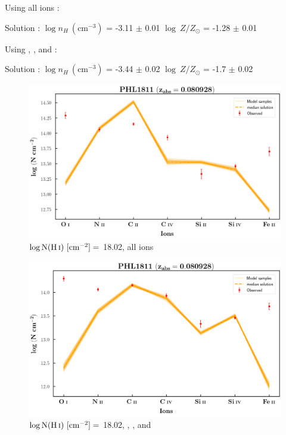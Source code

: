   Using all ions :
  
  Solution : $\log n_H \ (\text{cm}^{-3})$ = -3.11 $\pm$ 0.01 \hspace{10mm} $\log \ Z/Z_\odot$ = -1.28 $\pm$ 0.01 \newline  
  
  Using , ,  and  :
  
  Solution : $\log n_H \ (\text{cm}^{-3})$ = -3.44 $\pm$ 0.02 \hspace{10mm} $\log \ Z/Z_\odot$ = -1.7 $\pm$ 0.02 \newline 
  
  \newpage
  
  \begin{figure}[!t]
      \centering
      \includegraphics[width=0.85\linewidth]{Ionisation-Modelling-Plots/phl1811-z=0.080928-compIII_logZ=-1.png}
      \caption{$\log \text{N}(\ion{H}{i}) \ [\text{cm}^{-2}]=$ 18.02, all ions}
  \end{figure}
  
  \begin{figure}[!b]
      \centering
      \includegraphics[width=0.85\linewidth]{Ionisation-Modelling-Plots/phl1811-z=0.080928-compIII_logZ=-1_ions.png}
      \caption{$\log \text{N}(\ion{H}{i}) \ [\text{cm}^{-2}]=$ 18.02, , ,  and }
  \end{figure}
  
